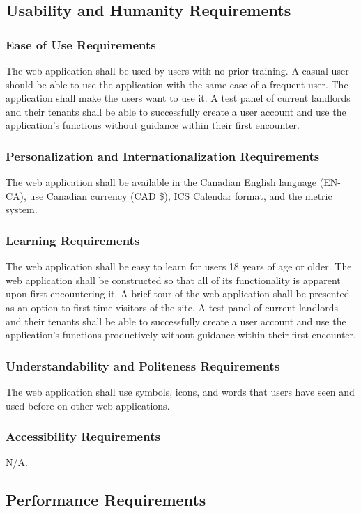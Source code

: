 \documentclass[12pt]{article}
\begin{document}
{\subsection{Usability and Humanity Requirements}
\subsubsection{Ease of Use Requirements}
The 
web application shall be used by users with no prior training. A casual user should 
be able to use the application with the same ease of a frequent user. The 
application shall make the users want to use it. A test panel of current 
landlords and their tenants shall be able to successfully create a user account 
and use the application's functions without guidance within their first 
encounter.
\subsubsection{Personalization and Internationalization Requirements}
The web application shall be available in the Canadian English language (EN-CA),  use 
Canadian currency (CAD \$), ICS Calendar format, and the metric system.
\subsubsection{Learning Requirements}
The web application shall be easy to learn for users 18 years of age or older. The web 
application shall be constructed so that all of its functionality is apparent 
upon first encountering it. A brief tour of the web application shall be 
presented as an option to first time visitors of the site. A test panel of 
current landlords and their tenants shall be able to successfully create a user 
account and use the application's functions productively without guidance within 
their first encounter.
\subsubsection{Understandability and Politeness Requirements}
The web application shall use symbols, icons, and words that users have seen and used before on other web applications.
\subsubsection{Accessibility Requirements}
N/A.
\subsection{Performance Requirements}
}
\end{document}
